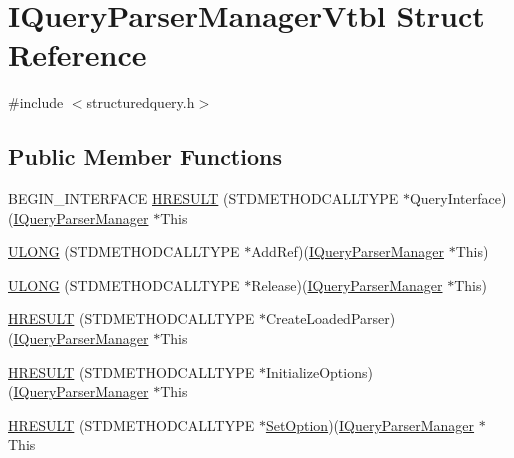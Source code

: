 \hypertarget{struct_i_query_parser_manager_vtbl}{}\section{I\+Query\+Parser\+Manager\+Vtbl Struct Reference}
\label{struct_i_query_parser_manager_vtbl}


{\ttfamily \#include $<$structuredquery.\+h$>$}

\subsection*{Public Member Functions}
\begin{DoxyCompactItemize}
\item 
B\+E\+G\+I\+N\+\_\+\+I\+N\+T\+E\+R\+F\+A\+CE \hyperlink{struct_i_query_parser_manager_vtbl_ad20ec70450ba93212d7c00f0b374852a}{H\+R\+E\+S\+U\+LT} (S\+T\+D\+M\+E\+T\+H\+O\+D\+C\+A\+L\+L\+T\+Y\+PE $\ast$Query\+Interface)(\hyperlink{structuredquery_8h_a94163bf1bdf13a879dad7ad713eece37}{I\+Query\+Parser\+Manager} $\ast$This
\item 
\hyperlink{struct_i_query_parser_manager_vtbl_a24c9f8b83576d3dd0857e431c40595cb}{U\+L\+O\+NG} (S\+T\+D\+M\+E\+T\+H\+O\+D\+C\+A\+L\+L\+T\+Y\+PE $\ast$Add\+Ref)(\hyperlink{structuredquery_8h_a94163bf1bdf13a879dad7ad713eece37}{I\+Query\+Parser\+Manager} $\ast$This)
\item 
\hyperlink{struct_i_query_parser_manager_vtbl_a751dc511b64e94d47743efdbda3f4bf8}{U\+L\+O\+NG} (S\+T\+D\+M\+E\+T\+H\+O\+D\+C\+A\+L\+L\+T\+Y\+PE $\ast$Release)(\hyperlink{structuredquery_8h_a94163bf1bdf13a879dad7ad713eece37}{I\+Query\+Parser\+Manager} $\ast$This)
\item 
\hyperlink{struct_i_query_parser_manager_vtbl_a0576c989a241d4a94bba78b6c9db62c3}{H\+R\+E\+S\+U\+LT} (S\+T\+D\+M\+E\+T\+H\+O\+D\+C\+A\+L\+L\+T\+Y\+PE $\ast$Create\+Loaded\+Parser)(\hyperlink{structuredquery_8h_a94163bf1bdf13a879dad7ad713eece37}{I\+Query\+Parser\+Manager} $\ast$This
\item 
\hyperlink{struct_i_query_parser_manager_vtbl_a636479e5d83c4524c727aff9d4d27dae}{H\+R\+E\+S\+U\+LT} (S\+T\+D\+M\+E\+T\+H\+O\+D\+C\+A\+L\+L\+T\+Y\+PE $\ast$Initialize\+Options)(\hyperlink{structuredquery_8h_a94163bf1bdf13a879dad7ad713eece37}{I\+Query\+Parser\+Manager} $\ast$This
\item 
\hyperlink{struct_i_query_parser_manager_vtbl_ae406203554fa986fb0a033bff9e06576}{H\+R\+E\+S\+U\+LT} (S\+T\+D\+M\+E\+T\+H\+O\+D\+C\+A\+L\+L\+T\+Y\+PE $\ast$\hyperlink{_track_panel_8cpp_afe73cd8abf3b46ca6b5501768ad042f2}{Set\+Option})(\hyperlink{structuredquery_8h_a94163bf1bdf13a879dad7ad713eece37}{I\+Query\+Parser\+Manager} $\ast$This
\end{DoxyCompactItemize}
